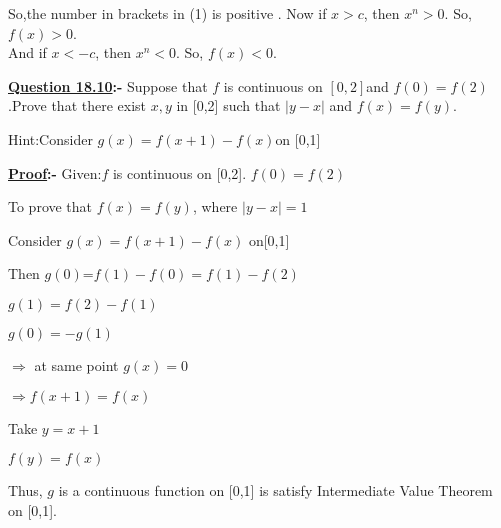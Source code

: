 \documentclass[12pt]{article}
\begin{document}
 So,the number in brackets in (1) is positive . Now if $x>c$, then $x^n>0$. So, $f(x)>0$.\\
 And if $x<-c$, then $x^n<0$. So, $f(x)<0$.

\vspace{1cm}

\begin{mdframed}[style=MyFrame]
\textbf{\underline{Question 18.10}:-} Suppose that  $f$ is continuous on $[0,2]$and  $f(0)=f(2)$.Prove that there exist ${x,y}$ in [0,2] such that $|y-x|$ and $f(x)=f(y).$

\vspace{.4cm}

Hint:Consider $g(x)=f(x+1)-f(x)$on [0,1]
\end{mdframed}
\vspace*{1cm}


\textbf{\underline{Proof}:-} Given:$f$ is continuous on [0,2]. $f(0)=f(2)$

\vspace{.3cm}

To prove that $f(x)=f(y)$, where $|y-x|=1$

\vspace{.3cm}

Consider $g(x)=f(x+1)-f(x)$ on[0,1]

\vspace{.3cm}

Then $g(0)$=$f(1)-f(0)=f(1)-f(2)$

\vspace{.3cm}

$g(1)=f(2)-f(1)$

\vspace{.3cm}

$g(0)=-g(1)$

\vspace{.3cm}

$\Rightarrow$  at same point $g(x)=0$

\vspace{.3cm}

$ \Rightarrow f(x+1)=f(x)$

\vspace{.3cm}

Take $y=x+1 $

\vspace{.3cm}

$f(y)=f(x)$

\vspace{.4cm}

Thus, $g$ is a continuous function on [0,1] is satisfy Intermediate Value Theorem on [0,1].
\end{document}
